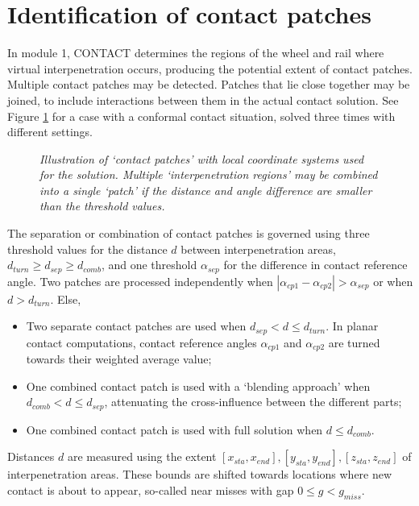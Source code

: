 \documentclass[12pt]{report}
\begin{document}
\section{Identification of contact patches}
\label{sec:cpatches}

In module 1, CONTACT determines the regions of the wheel and rail where
virtual interpenetration occurs, producing the potential extent of 
contact patches. Multiple contact patches may be detected. Patches that lie
close together may be joined, to include interactions between them in the
actual contact solution. See Figure \ref{fig:site_b_cpatch} for a case with
a conformal contact situation, solved three times with different settings.

\begin{figure}[bt]
\centering
{}
\caption{\em Illustration of `contact patches' with local coordinate
        systems used for the solution. Multiple `interpenetration regions'
        may be combined into a single `patch' if the distance and angle
        difference are smaller than the threshold values.}
\label{fig:site_b_cpatch}
\end{figure}

The separation or combination of contact patches is governed using three
threshold values for the distance $d$ between interpenetration areas,
$d_{turn}\ge d_{sep}\ge d_{comb}$, and one threshold $\alpha_{sep}$ for
the difference in contact reference angle. Two patches are processed
independently when $|\alpha_{cp1}- \alpha_{cp2}| > \alpha_{sep}$ or when
$d > d_{turn}$. Else,
\begin{itemize}
\item Two separate contact patches are used when $d_{sep} < d\le d_{turn}$.
        In planar contact computations, contact reference angles
        $\alpha_{cp1}$ and $\alpha_{cp2}$ are turned towards their
        weighted average value;
\item One combined contact patch is used with a `blending approach'
        when $d_{comb}< d\le d_{sep}$, attenuating the cross-influence
        between the different parts;
\item One combined contact patch is used with full solution when $d\le
        d_{comb}$.
\end{itemize}
Distances $d$ are measured using the extent $[x_{sta},x_{end}],
[y_{sta},y_{end}], [z_{sta},z_{end}]$ of interpenetration areas. These
bounds are shifted towards locations where new contact is about to appear,
so-called near misses with gap $0\le g<g_{miss}$.
\end{document}
